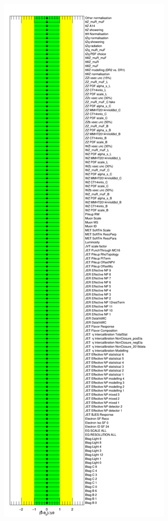 \documentclass[bachelor,oneside, BCOR10mm,
			ngerman,english  %
]{GAUBM}
\begin{document}
\begin{figure}
	\centering
	\includegraphics[width=.44\textwidth]{figures/initial_config/pullplots/NuisPar.png}\hspace{8mm}

\end{figure}
\end{document}
